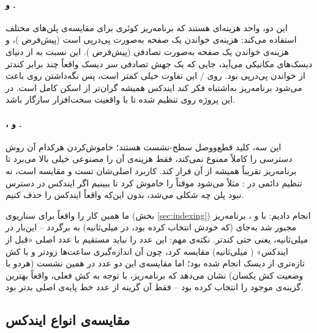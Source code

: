 \paragraph{ و .} این دو، واحد هزینه‌ای هستند که برنامه‌ریز کوئری برای مقایسه‌ی پلن‌های مختلف استفاده می‌کند:  هزینه‌ی خواندن یک صفحه به‌صورت پی‌درپی است (پیش‌فرض )، و  هزینه‌ی خواندن یک صفحه به‌صورت تصادفی (پیش‌فرض ). این نسبت  به  از دنیای دیسک‌های مکانیکی می‌آید، جایی که یک جهش تصادفی سر دیسک واقعاً چند برابر کندتر از خواندن پی‌درپی بود. روی / این تفاوت خیلی کمتر است، پس نگه‌داشتن  روی  باعث می‌شود برنامه‌ریز به‌اشتباه فکر کند ایندکس همیشه گران‌تر از اسکن کامل است. در این پروژه  روی  تنظیم شده تا با واقعیت سخت‌افزار سازگار باشد.

\paragraph{،  و .} این سه، کلید قطع‌ووصل سطح-نشست هستند؛ خاموش‌کردن هرکدام آن روش دسترسی را کاملاً ممنوع نمی‌کند، فقط هزینه‌ی آن را مصنوعی خیلی بالا می‌برد تا برنامه‌ریز تقریباً همیشه از آن فرار کند. کاربرد اصلی‌شان تست و مقایسه است، نه تنظیم دائمی در : مثلاً می‌شود موقتاً  را خاموش کرد تا ببینیم اگر ایندکس در دسترس نبود پلن چه شکلی می‌شد، بدون این‌که واقعاً ایندکس را حذف کنیم.

ما همین کار را واقعاً برای سناریوی  (بخش \ref{sec:indexing}) انجام دادیم: با  و ، برنامه‌ریز مجبور شد به‌جای  (که خودش انتخاب کرده بود، در  میلی‌ثانیه) به  برگردد -- این‌بار در  میلی‌ثانیه، یعنی حتی کندتر. نکته‌ی مهم: این عدد را نباید مستقیم با عدد اصلی «قبل از ایندکس» ( میلی‌ثانیه) مقایسه کرد، چون آن اندازه‌گیری ساعت‌ها زودتر و با کش تازه‌تری از دیسک انجام شده بود؛ اما مقایسه‌ی این دو عدد در همین نشست (هردو با وضعیت کش یکسان) نشان می‌دهد که برنامه‌ریز، با توجه به کش فعلی، واقعاً بهترین گزینه‌ی موجود را انتخاب کرده بود -- فقط آن گزینه از عدد خط پایه‌ی اصلی بدتر بود.

\subsection{مقایسه‌ی انواع ایندکس}


